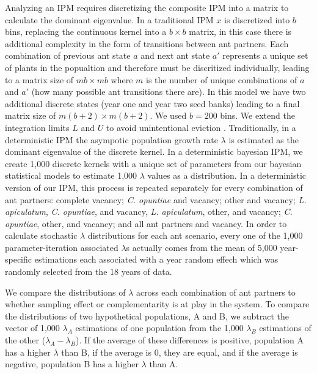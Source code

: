 \documentclass[11pt]{article}
\begin{document}
Analyzing an IPM requires discretizing the composite IPM into a matrix to calculate the dominant eigenvalue. 
In a traditional IPM $x$ is discretized into $b$ bins, replacing the continuous kernel into a $b \times b$ matrix, in this case there is additional complexity in the form of transitions between ant partners. 
Each combination of previous ant state $a$ and next ant state $a'$ represents a unique set of plants in the popualtion and therefore must be discritized individually, leading to a matrix size of $m b \times m b$ where $m$ is the number of unique combinations of $a$ and $a'$ (how many possible ant transitions there are). 
In this model we have two additional discrete states (year one and year two seed banks) leading to a final matrix size of $m(b+2) \times m(b+2)$.
We used $b = 200$ bins.
We extend the integration limits $L$ and $U$ to avoid unintentional eviction \cite{Williams2012}.
Traditionally, in a deterministic IPM the asympotic population growth rate $\lambda$ is estimated as the dominant eigenvalue of the discrete kernel.
In a deterministic bayesian IPM, we create 1,000 discrete kernels with a unique set of parameters from our bayesian statistical models to estimate 1,000 $\lambda$ values as a distribution. 
In a deterministic version of our IPM, this process is repeated separately for every combination of ant partners: complete vacancy; \textit{C. opuntiae} and vacancy; other and vacancy; \textit{L. apiculatum}, \textit{C. opuntiae}, and vacancy, \textit{L. apiculatum}, other, and vacancy; \textit{C. opuntiae}, other, and vacancy; and all ant partners and vacancy.
In order to calculate stochastic $\lambda$ distributions for each ant scenario, every one of the 1,000 parameter-iteration associated $\lambda$s actually comes from the mean of 5,000 year-specific estimations each associated with a year random effech which was randomly selected from the 18 years of data. 

We compare the distributions of $\lambda$ across each combination of ant partners to whether sampling effect or complementarity is at play in the system.
To compare the distributions of two hypothetical populations, A and B, we subtract the vector of 1,000 $\lambda_A$ estimations of one population from the 1,000 $\lambda_B$ estimations of the other ($\lambda_A - \lambda_B$).
If the average of these differences is positive, population A has a higher $\lambda$ than B, if the average is 0, they are equal, and if the average is negative, population B has a higher $\lambda$ than A. 
\end{document}
